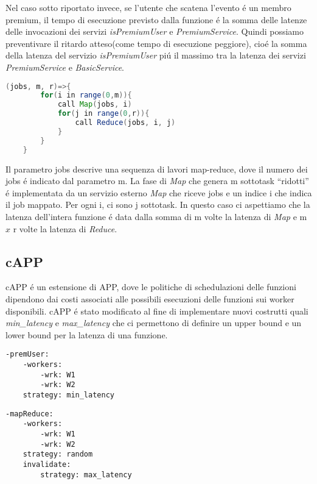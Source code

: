 \documentclass[../../main.tex]{subfiles}
\begin{document}
Nel caso sotto riportato invece, se l'utente che scatena l'evento é un membro premium, il tempo di esecuzione previsto dalla funzione é la somma delle latenze delle invocazioni dei servizi \textit{isPremiumUser} e \textit{PremiumService}.
Quindi possiamo preventivare il ritardo atteso(come tempo di esecuzione peggiore), cioé la somma della latenza del servizio \textit{isPremiumUser} piú il massimo tra la latenza dei servizi \textit{PremiumService} e \textit{BasicService}.

\begin{lstlisting}[language=Java, caption=Funzione con logica Map-Reduce,label={lst:3}]
    (jobs, m, r)=>{
        for(i in range(0,m)){
            call Map(jobs, i)
            for(j in range(0,r)){
                call Reduce(jobs, i, j)
            }
        }
    }
\end{lstlisting}
Il parametro jobs descrive una sequenza di lavori map-reduce, dove il numero dei jobs é indicato dal parametro m.
La fase di \textit{Map} che genera m sottotask ``ridotti'' é implementata da un servizio esterno \textit{Map} che riceve jobs e un indice i che indica il job mappato.
Per ogni i, ci sono j sottotask.
In questo caso ci aspettiamo che la latenza dell'intera funzione é data dalla somma di m volte la latenza di \textit{Map} e m $x$ r volte la latenza di \textit{Reduce}.\\
\subsection{cAPP}
\label{cApp}
cAPP é un estensione di APP, dove le politiche di schedulazioni delle funzioni dipendono dai costi associati alle possibili esecuzioni delle funzioni sui worker disponibili.
\autocite {deserverless}
cAPP é stato modificato al fine di implementare nuovi costrutti quali \textit{min\_latency} e \textit{max\_latency} che ci permettono di definire un upper bound e un lower bound per la latenza di una funzione.
\begin{multicols}{2}
    \begin{lstlisting}[caption={cAPP for Listing \ref{lst:1} e \ref{lst:2}},label={lst:4}]
-premUser:
    -workers:
        -wrk: W1
        -wrk: W2
    strategy: min_latency
    \end{lstlisting}
    \columnbreak
    \begin{lstlisting}[caption={cAPP for Listing~\ref{lst:3}}, label={lst:5}]
-mapReduce:
    -workers:
        -wrk: W1
        -wrk: W2
    strategy: random
    invalidate:
        strategy: max_latency
    \end{lstlisting}
\end{multicols}
\end{document}

